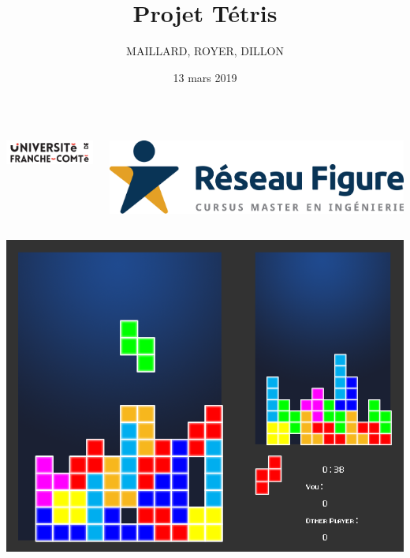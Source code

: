 \documentclass[french]{beamer}
\title{Projet Tétris}
\author{MAILLARD, ROYER, DILLON}
\date{13 mars 2019}
\begin{document}


\begin{frame}

	\begin{columns}

		\hspace{-2.5cm}
		\begin{column}{0.2\textwidth}
			\includegraphics[scale=0.3]{img/logU.png}
	
		\end{column}
		
		\begin{column}{0.2\textwidth}
			\vspace{0.1cm}
			\includegraphics[scale=0.045]{img/logF.jpg}

		\end{column}

	\end{columns}

	\vspace{-0.15cm}


	\vspace{0.2cm}

	\includegraphics[scale=0.15]{img/vouitris.png}


\end{frame}
\end{document}
